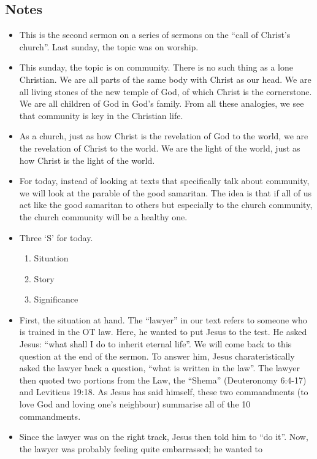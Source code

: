 \subsection*{Notes}
\begin{itemize}
  \item{This is the second sermon on a series of sermons on the ``call of
  Christ's church''. Last sunday, the topic was on worship. }
  \item{This sunday, the topic is on community. There is no such thing as a
  lone Christian. We are all parts of the same body with Christ as our head.
  We are all living stones of the new temple of God, of which Christ is the
  cornerstone. We are all children of God in God's family. From all these
  analogies, we see that community is key in the Christian life.}
  \item{As a church, just as how Christ is the revelation of God to the world, we are the revelation of Christ to the world. We are the light of the world, just as how Christ is the light of the world.}
  \item{For today, instead of looking at texts that specifically talk about community, we will look at the parable of the good samaritan. The idea is that if all of us act like the good samaritan to others but especially to the church community, the church community will be a healthy one.}
  \item{Three `S' for today. 
  \begin{enumerate}
    \item{Situation}
    \item{Story}
    \item{Significance}
  \end{enumerate}}
  \item{First, the situation at hand. The ``lawyer'' in our text refers to
  someone who is trained in the OT law. Here, he wanted to put Jesus to the
  test. He asked Jesus: ``what shall I do to inherit eternal life''. We will
  come back to this question at the end of the sermon. To answer him, Jesus
  charateristically asked the lawyer back a question, ``what is written in
  the law''. The lawyer then quoted two portions from the Law, the ``Shema''
  (Deuteronomy 6:4-17) and Leviticus 19:18. As Jesus has said himself, these
  two commandments (to love God and loving one's neighbour) summarise all of
  the 10 commandments.}
  \item{Since the lawyer was on the right track, Jesus then told him to ``do
  it''. Now, the lawyer was probably feeling quite embarrassed; he wanted to
}
\end{itemize}
